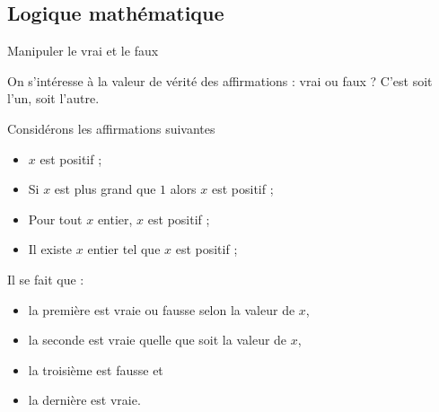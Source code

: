 \documentclass[french,xcolor=svgnames]{beamer}
\begin{document}
\subsection{Logique mathématique}
\begin{frame}{Manipuler le vrai et le faux}
  \begin{definition}
    On s'intéresse à la valeur de vérité des affirmations : vrai ou faux ? C'est soit l'un, soit l'autre.
  \end{definition}\pause{}

  \begin{example}\pause{}
    Considérons les affirmations suivantes\pause{}
    \begin{itemize}[<+->]
    \item \og $x$ est positif\fg{} ;
    \item \og Si \(x\) est plus grand que \(1\) alors \(x\) est positif\fg{} ;
    \item \og Pour tout $x$ entier, $x$ est positif\fg{} ;
    \item \og Il existe $x$ entier tel que $x$ est positif\fg{} ;
    \end{itemize}
  \end{example}
\end{frame}
\begin{frame}
  \begin{example}
    Il se fait que :
    \begin{itemize}
    \item la première est vraie ou fausse selon la valeur de $x$,
    \item la seconde est vraie quelle que soit la valeur de \(x\),
    \item la troisième est fausse et
    \item la dernière est vraie.
    \end{itemize}
  \end{example}
\end{frame}
\end{document}
